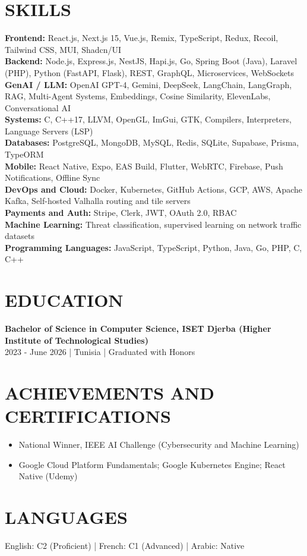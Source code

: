 \section{SKILLS}
\textbf{Frontend:} React.js, Next.js 15, Vue.js, Remix, TypeScript, Redux, Recoil, Tailwind CSS, MUI, Shadcn/UI\\
\textbf{Backend:} Node.js, Express.js, NestJS, Hapi.js, Go, Spring Boot (Java), Laravel (PHP), Python (FastAPI, Flask), REST, GraphQL, Microservices, WebSockets\\
\textbf{GenAI / LLM:} OpenAI GPT-4, Gemini, DeepSeek, LangChain, LangGraph, RAG, Multi-Agent Systems, Embeddings, Cosine Similarity, ElevenLabs, Conversational AI\\
\textbf{Systems:} C, C++17, LLVM, OpenGL, ImGui, GTK, Compilers, Interpreters, Language Servers (LSP)\\
\textbf{Databases:} PostgreSQL, MongoDB, MySQL, Redis, SQLite, Supabase, Prisma, TypeORM\\
\textbf{Mobile:} React Native, Expo, EAS Build, Flutter, WebRTC, Firebase, Push Notifications, Offline Sync\\
\textbf{DevOps and Cloud:} Docker, Kubernetes, GitHub Actions, GCP, AWS, Apache Kafka, Self-hosted Valhalla routing and tile servers\\
\textbf{Payments and Auth:} Stripe, Clerk, JWT, OAuth 2.0, RBAC\\
\textbf{Machine Learning:} Threat classification, supervised learning on network traffic datasets\\
\textbf{Programming Languages:} JavaScript, TypeScript, Python, Java, Go, PHP, C, C++

\section{EDUCATION}
\textbf{Bachelor of Science in Computer Science, ISET Djerba (Higher Institute of Technological Studies)}\\
2023 - June 2026 | Tunisia | Graduated with Honors

\section{ACHIEVEMENTS AND CERTIFICATIONS}
\begin{itemize}
  \item National Winner, IEEE AI Challenge (Cybersecurity and Machine Learning)
  \item Google Cloud Platform Fundamentals; Google Kubernetes Engine; React Native (Udemy)
\end{itemize}

\section{LANGUAGES}
English: C2 (Proficient) | French: C1 (Advanced) | Arabic: Native

